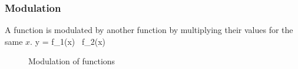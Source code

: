 \subsubsection{Modulation}
A function is modulated by another function by multiplying their values for the same $x$. 
\bnn y = f_1(x) \, f_2(x) \enn

\vs\begin{figure}[!h]
    \centering
    \hspace{0.5cm}
      \svs
    \caption{Modulation of functions} \label{fig19}
\end{figure}

\newpage